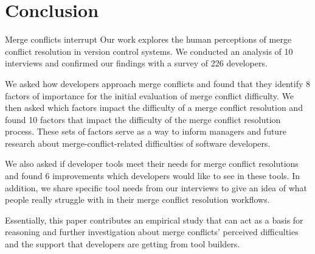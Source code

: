 \section{Conclusion}\label{conclusion}
Merge conflicts interrupt 
Our work explores the human perceptions of merge conflict resolution in version control systems. We conducted an analysis of 10 interviews and confirmed our findings with a survey of 226 developers.

We asked how developers approach merge conflicts and found that they identify 8 factors of importance for the initial evaluation of merge conflict difficulty. 
We then asked which factors impact the difficulty of a merge conflict resolution and found 10 factors that impact the difficulty of the merge conflict resolution process. 
These sets of factors serve as a way to inform managers and future research about merge-conflict-related difficulties of software developers.

We also asked if developer tools meet their needs for merge conflict resolutions and found 6 improvements which developers would like to see in these tools. In addition, we share specific tool needs from our interviews to give an idea of what people really struggle with in their merge conflict resolution workflows.

Essentially, this paper contributes an empirical study that can act as a basis for reasoning and further investigation about merge conflicts' perceived difficulties and the support that developers are getting from tool builders. 